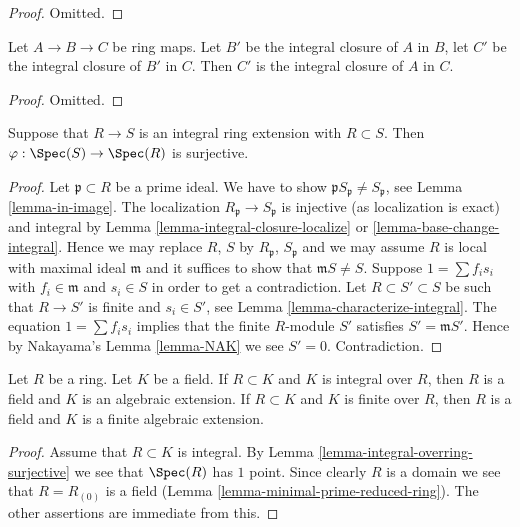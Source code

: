 \begin{proof}
Omitted.
\end{proof}

\begin{lemma}
\label{lemma-integral-closure-transitive}
Let $A \to B \to C$ be ring maps.
Let $B'$ be the integral closure of $A$ in $B$,
let $C'$ be the integral closure of $B'$ in $C$. Then
$C'$ is the integral closure of $A$ in $C$.
\end{lemma}

\begin{proof}
Omitted.
\end{proof}

\begin{lemma}
\label{lemma-integral-overring-surjective}
Suppose that $R \to S$ is an integral
ring extension with $R \subset S$.
Then $\varphi : \Spec(S) \to \Spec(R)$
is surjective.
\end{lemma}

\begin{proof}
Let $\mathfrak p \subset R$ be a prime ideal.
We have to show $\mathfrak pS_{\mathfrak p} \not = S_{\mathfrak p}$, see
Lemma \ref{lemma-in-image}.
The localization $R_{\mathfrak p} \to S_{\mathfrak p}$ is injective
(as localization is exact) and integral by
Lemma \ref{lemma-integral-closure-localize} or
\ref{lemma-base-change-integral}.
Hence we may replace $R$, $S$ by $R_{\mathfrak p}$, $S_{\mathfrak p}$ and
we may assume $R$ is local with maximal ideal $\mathfrak m$ and
it suffices to show that $\mathfrak mS \not = S$.
Suppose $1 = \sum f_i s_i$ with $f_i \in \mathfrak m$
and $s_i \in S$ in order to get a contradiction.
Let $R \subset S' \subset S$
be such that $R \to S'$ is finite and $s_i \in S'$, see
Lemma \ref{lemma-characterize-integral}.
The equation $1 = \sum f_i s_i$ implies that
the finite $R$-module $S'$ satisfies $S' = \mathfrak m S'$. Hence by
Nakayama's Lemma \ref{lemma-NAK}
we see $S' = 0$. Contradiction.
\end{proof}

\begin{lemma}
\label{lemma-integral-under-field}
Let $R$ be a ring. Let $K$ be a field.
If $R \subset K$ and $K$ is integral over $R$,
then $R$ is a field and $K$ is an algebraic extension.
If $R \subset K$ and $K$ is finite over $R$,
then $R$ is a field and $K$ is a finite algebraic extension.
\end{lemma}

\begin{proof}
Assume that $R \subset K$ is integral.
By Lemma \ref{lemma-integral-overring-surjective} we see that
$\Spec(R)$ has $1$ point. Since clearly $R$ is a domain we see
that $R = R_{(0)}$ is a field (Lemma \ref{lemma-minimal-prime-reduced-ring}).
The other assertions are immediate from this.
\end{proof}


